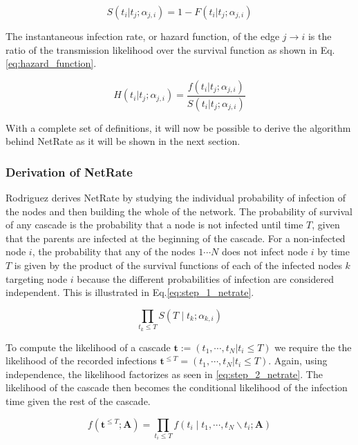 \documentclass[11pt]{article}
\begin{document}
\begin{equation}\label{eq:survival_function}
S(t_{i}|t_{j};\alpha _{j,i})=1-F(t_{i}|t_{j};\alpha _{j,i})
\end{equation}

The instantaneous infection rate, or hazard function, of the edge $j\rightarrow i$ is the ratio of the transmission likelihood over the survival function as shown in Eq.\ref{eq:hazard_function}.

\begin{equation}\label{eq:hazard_function}
H(t_{i}|t_{j};\alpha _{j,i})=\frac{f(t_{i}|t_{j};\alpha _{j,i})}{S(t_{i}|t_{j};\alpha _{j,i})}
\end{equation}

With a complete set of definitions, it will now be possible to derive the algorithm behind NetRate as it will be shown in the next section.

\subsubsection{Derivation of NetRate}

Rodriguez \cite{rodriguez2011uncovering} derives NetRate by studying the individual probability of infection of the nodes and then building the whole of the network. The probability of survival of any cascade is the probability that a node is not infected until time $T$, given that the parents are infected at the beginning of the cascade. For a non-infected node $i$, the probability that any of the nodes $1\cdots N$ does not infect node $i$ by time $T$ is given by the product of the survival functions of each of the infected nodes $k$ targeting node $i$ because the different probabilities of infection are considered independent. This is illustrated in Eq.\ref{eq:step_1_netrate}.

\begin{equation}\label{eq:step_1_netrate}
\prod_{t_{k}\leq T}S(T\mid t_{k};\alpha _{k,i})
\end{equation}

To compute the likelihood of a cascade $\textbf{t}:=(t_{1},\cdots,t_{N}|t_{i}\leq T)$ we require the the likelihood of the recorded infections $\textbf{t}^{\leq T}=(t_{1},\cdots,t_{N}|t_{i}\leq T)$. Again, using independence, the likelihood factorizes as seen in \ref{eq:step_2_netrate}. The likelihood of the cascade then becomes the conditional likelihood of the infection time given the rest of the cascade.

\begin{equation}\label{eq:step_2_netrate}
f(\textbf{t}^{\leq T};\textbf{A})=\prod_{t_{i}\leq T}f(t_{i}\mid t_{1},\cdots,t_{N}\backslash t_{i};\textbf{A})
\end{equation}
\end{document}
